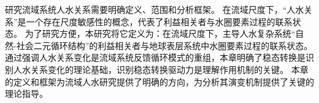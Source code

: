 研究流域系统人\textendash{}水关系需要明确定义、范围和分析框架。
在流域尺度下，“人\textendash{}水关系”是一个存在尺度敏感性的概念，代表了利益相关者与水圈要素过程的联系状态。
为了研究方便，本研究将它定义为：在流域尺度下，主导人水复杂系统“自然-社会二元循环结构”的利益相关者与地球表层系统中水圈要素过程的联系状态。
通过强调人\textendash{}水关系变化是流域系统反馈循环模式的重组，本章明确了稳态转换是识别人\textendash{}水关系变化的理论基础，识别稳态转换驱动力是理解作用机制的关键。
本章的定义和框架为流域人水研究提供了明确的方向，为分析其演变机制提供了关键的理论指导。
